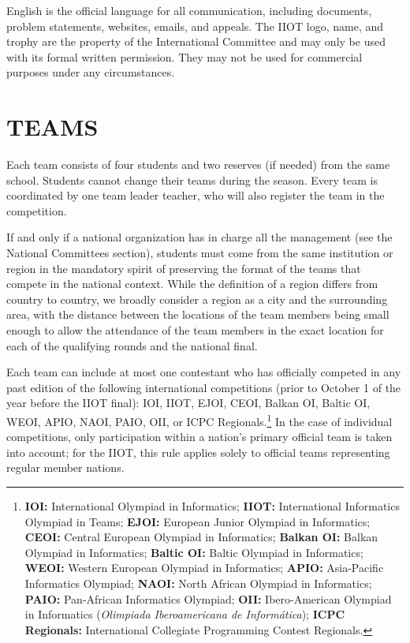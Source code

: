 \documentclass{article}
\begin{document}
English is the official language for all communication, including documents, problem statements, websites, emails, and appeals. The IIOT logo, name, and trophy are the property of the International Committee and may only be used with its formal written permission. They may not be used for commercial purposes under any circumstances.

\section{TEAMS}

Each team consists of four students and two reserves (if needed) from the same school. Students cannot change their teams during the season. Every team is coordinated by one team leader teacher, who will also register the team in the competition.

If and only if a national organization has in charge all the management (see the National Committees section), students must come from the same institution or region in the mandatory spirit of preserving the format of the teams that compete in the national context. While the definition of a region differs from country to country, we broadly consider a region as a city and the surrounding area, with the distance between the locations of the team members being small enough to allow the attendance of the team members in the exact location for each of the qualifying rounds and the national final.

Each team can include at most one contestant who has officially competed in any past edition of the following international competitions (prior to October 1 of the year before the IIOT final):
IOI, IIOT, EJOI, CEOI, Balkan OI, Baltic OI, WEOI, APIO, NAOI, PAIO, OII, or ICPC Regionals.\footnote{%
\textbf{IOI:} International Olympiad in Informatics; 
\textbf{IIOT:} International Informatics Olympiad in Teams; 
\textbf{EJOI:} European Junior Olympiad in Informatics; 
\textbf{CEOI:} Central European Olympiad in Informatics; 
\textbf{Balkan OI:} Balkan Olympiad in Informatics; 
\textbf{Baltic OI:} Baltic Olympiad in Informatics; 
\textbf{WEOI:} Western European Olympiad in Informatics; 
\textbf{APIO:} Asia-Pacific Informatics Olympiad; 
\textbf{NAOI:} North African Olympiad in Informatics; 
\textbf{PAIO:} Pan-African Informatics Olympiad; 
\textbf{OII:} Ibero-American Olympiad in Informatics (\textit{Olimpiada Iberoamericana de Informática}); 
\textbf{ICPC Regionals:} International Collegiate Programming Contest Regionals.}
In the case of individual competitions, only participation within a nation's primary official team is taken into account; for the IIOT, this rule applies solely to official teams representing regular member nations.
\end{document}
